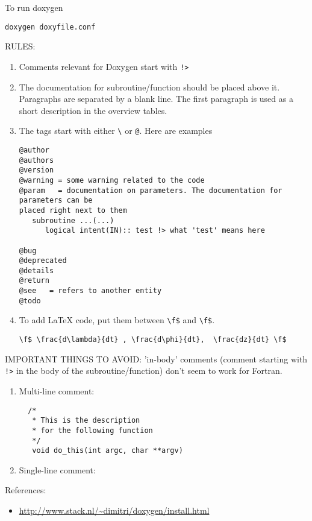 To run doxygen
\begin{verbatim}
doxygen doxyfile.conf
\end{verbatim}

RULES:
\begin{enumerate}
  \item Comments relevant for Doxygen start with \verb.!>.
  \item The documentation for subroutine/function should be placed above it.
  Paragraphs are separated by a blank line. The first paragraph is used as a
  short description in the overview tables.
  
  \item The tags start with either \verb!\! or \verb!@!. Here are examples
\begin{verbatim}
@author
@authors
@version
@warning = some warning related to the code
@param   = documentation on parameters. The documentation for parameters can be
placed right next to them
   subroutine ...(...)
      logical intent(IN):: test !> what 'test' means here

@bug 
@deprecated
@details
@return
@see   = refers to another entity
@todo      
\end{verbatim}

   \item To add LaTeX code, put them between \verb!\f$! and \verb!\f$!.
   
\begin{verbatim}
\f$ \frac{d\lambda}{dt} , \frac{d\phi}{dt},  \frac{dz}{dt} \f$
\end{verbatim}

\end{enumerate}

IMPORTANT THINGS TO AVOID: 'in-body' comments (comment starting with \verb.!>.
in the body of the subroutine/function) don't seem to work for Fortran.


\begin{enumerate}
  \item Multi-line comment:
  \begin{verbatim}
  /*
   * This is the description
   * for the following function
   */
   void do_this(int argc, char **argv)
  \end{verbatim}
  \item Single-line comment:
\end{enumerate}


References:
\begin{itemize}
\item \url{http://www.stack.nl/~dimitri/doxygen/install.html}
\end{itemize}

